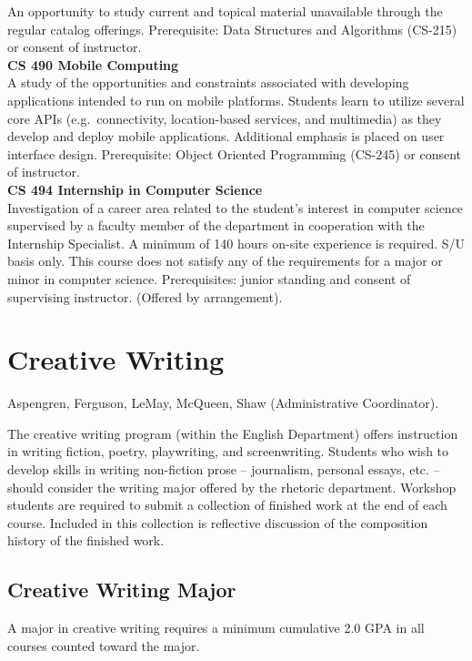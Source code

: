 \documentclass[
  letterpaper,
]{scrbook}
\begin{document}
An opportunity to study current and topical material unavailable through
the regular catalog offerings. Prerequisite: Data Structures and
Algorithms (CS-215) or consent of instructor.\\
\textbf{CS 490 Mobile Computing}\\
A study of the opportunities and constraints associated with developing
applications intended to run on mobile platforms. Students learn to
utilize several core APIs (e.g.~connectivity, location-based services,
and multimedia) as they develop and deploy mobile applications.
Additional emphasis is placed on user interface design. Prerequisite:
Object Oriented Programming (CS-245) or consent of instructor.\\
\textbf{CS 494 Internship in Computer Science}\\
Investigation of a career area related to the student's interest in
computer science supervised by a faculty member of the department in
cooperation with the Internship Specialist. A minimum of 140 hours
on-site experience is required. S/U basis only. This course does not
satisfy any of the requirements for a major or minor in computer
science. Prerequisites: junior standing and consent of supervising
instructor. (Offered by arrangement).

\section{Creative Writing}\label{sec-creative-writing}

Aspengren, Ferguson, LeMay, McQueen, Shaw (Administrative Coordinator).

The creative writing program (within the English Department) offers
instruction in writing fiction, poetry, playwriting, and screenwriting.
Students who wish to develop skills in writing non-fiction prose --
journalism, personal essays, etc. -- should consider the writing major
offered by the rhetoric department. Workshop students are required to
submit a collection of finished work at the end of each course. Included
in this collection is reflective discussion of the composition history
of the finished work.

\subsection{Creative Writing Major}\label{creative-writing-major}

A major in creative writing requires a minimum cumulative 2.0 GPA in all
courses counted toward the major.
\end{document}
